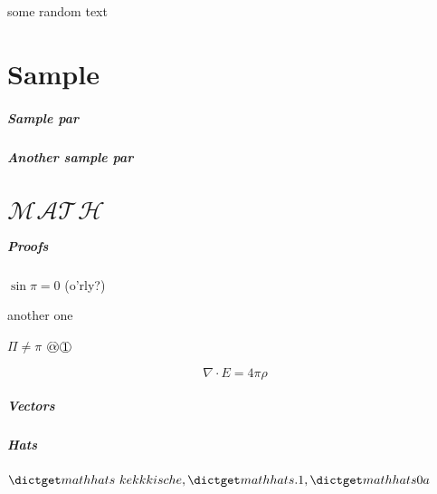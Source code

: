 \documentclass{trlnotes}
\begin{document}
\tableofcontents
\clearpage
some random text

\chapter{Sample}
\paragraph{Sample par}
\blindtext

\paragraph{Another sample par}
\blindtext

\chapter{$\mathcal{M\!AT\!H}$\underdev}

\paragraph{Proofs}
\label{sub:proofs}

\begin{tproof}[kek?]
  $\sin\pi=0$ (o'rly?)
  \begin{lproof}[nested]
    another one
    \begin{pproof}
      $\Pi\neq\pi$
      {%
        \fboxsep=0pt
        \fbox{$\bigcirc$}\fbox{$\mathord{\Rightarrow}\vphantom{<}$}
      }%
      \circlearound{$\mathord{\Rightarrow}\vphantom{>}$}%
      $\circlearound{\alpha}\,\circlearound{1}$
    \end{pproof}
  \end{lproof}
\end{tproof}

\begin{equation}
  \nabla \cdot E = 4 \pi \rho
\end{equation}

\paragraph{Vectors}%
\paragraph{Hats}

$\ov~{kekkkische}, \ov.{1}, \ov0a$
 
\end{document}
